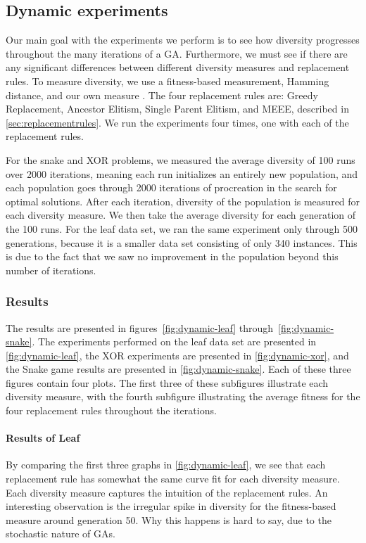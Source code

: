 \subsection{Dynamic experiments}\label{sec:continuousdiversity}
Our main goal with the experiments we perform is to see how diversity progresses throughout the many iterations of a GA. Furthermore, we must see if there are any significant differences between different diversity measures and replacement rules. To measure diversity, we use a fitness-based measurement, Hamming distance, and our own measure \dia. The four replacement rules are: Greedy Replacement, Ancestor Elitism, Single Parent Elitism, and MEEE, described in \cref{sec:replacementrules}. We run the experiments four times, one with each of the replacement rules.

For the snake and XOR problems, we measured the average diversity of \num{100} runs over \num{2000} iterations, meaning each run initializes an entirely new population, and each population goes through \num{2000} iterations of procreation in the search for optimal solutions. After each iteration, diversity of the population is measured for each diversity measure. We then take the average diversity for each generation of the \num{100} runs. For the leaf data set, we ran the same experiment only through \num{500} generations, because it is a smaller data set consisting of only \num{340} instances. This is due to the fact that we saw no improvement in the population beyond this number of iterations. 

\subsubsection{Results}
The results are presented in figures~\ref{fig:dynamic-leaf} through~\ref{fig:dynamic-snake}. The experiments performed on the leaf data set are presented in \cref{fig:dynamic-leaf}, the XOR experiments are presented in \cref{fig:dynamic-xor}, and the Snake game results are presented in \cref{fig:dynamic-snake}. Each of these three figures contain four plots. The first three of these subfigures illustrate each diversity measure, with the fourth subfigure illustrating the average fitness for the four replacement rules throughout the iterations. 

\paragraph{Results of Leaf} By comparing the first three graphs in \cref{fig:dynamic-leaf}, we see that each replacement rule has somewhat the same curve fit for each diversity measure. Each diversity measure captures the intuition of the replacement rules. An interesting observation is the irregular spike in diversity for the fitness-based measure around generation \num{50}. Why this happens is hard to say, due to the stochastic nature of GAs.

